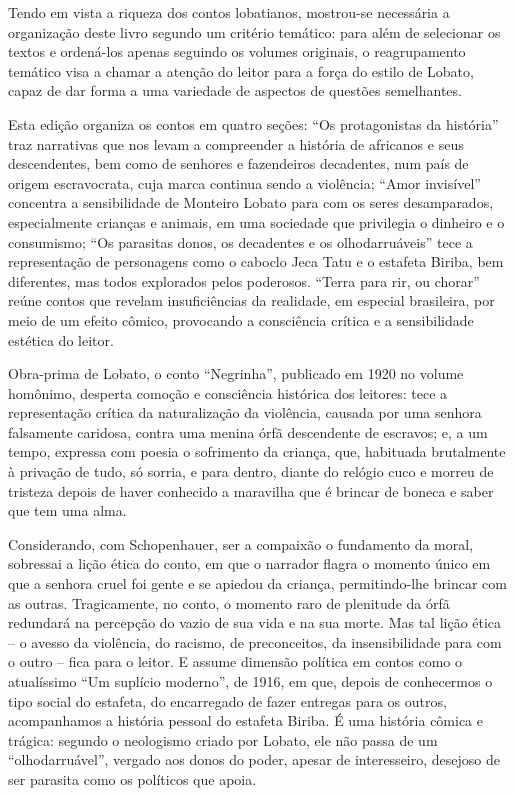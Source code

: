\documentclass[11pt]{extarticle}
\begin{document}
Tendo em vista a riqueza dos contos lobatianos, mostrou-se necessária a
organização deste livro segundo um critério temático: para além de
selecionar os textos e ordená-los apenas seguindo os volumes originais,
o reagrupamento temático visa a chamar a atenção do leitor para a força
do estilo de Lobato, capaz de dar forma a uma variedade de aspectos de
questões semelhantes.

Esta edição organiza os contos em quatro seções: ``Os protagonistas da
história'' traz narrativas que nos levam a compreender a história de
africanos e seus descendentes, bem como de senhores e fazendeiros
decadentes, num país de origem escravocrata, cuja marca continua sendo a
violência; ``Amor invisível'' concentra a sensibilidade de Monteiro
Lobato para com os seres desamparados, especialmente crianças e animais,
em uma sociedade que privilegia o dinheiro e o consumismo; ``Os
parasitas donos, os decadentes e os olhodarruáveis'' tece a
representação de personagens como o caboclo Jeca Tatu e o estafeta
Biriba, bem diferentes, mas todos explorados pelos poderosos. ``Terra
para rir, ou chorar'' reúne contos que revelam insuficiências da
realidade, em especial brasileira, por meio de um efeito cômico,
provocando a consciência crítica e a sensibilidade estética do leitor.

Obra-prima de Lobato, o conto ``Negrinha'', publicado em 1920 no volume
homônimo, desperta comoção e consciência histórica dos leitores: tece a
representação crítica da naturalização da violência, causada por uma
senhora falsamente caridosa, contra uma menina órfã descendente de
escravos; e, a um tempo, expressa com poesia o sofrimento da criança,
que, habituada brutalmente à privação de tudo, só sorria, e para dentro,
diante do relógio cuco e morreu de tristeza depois de haver conhecido a
maravilha que é brincar de boneca e saber que tem uma alma.

Considerando, com Schopenhauer, ser a compaixão o fundamento da moral,
sobressai a lição ética do conto, em que o narrador flagra o momento
único em que a senhora cruel foi gente e se apiedou da criança,
permitindo-lhe brincar com as outras. Tragicamente, no conto, o momento
raro de plenitude da órfã redundará na percepção do vazio de sua vida e
na sua morte. Mas tal lição ética -- o avesso da violência, do racismo,
de preconceitos, da insensibilidade para com o outro -- fica para o
leitor. E assume dimensão política em contos como o atualíssimo ``Um
suplício moderno'', de 1916, em que, depois de conhecermos o tipo social
do estafeta, do encarregado de fazer entregas para os outros,
acompanhamos a história pessoal do estafeta Biriba. É uma história
cômica e trágica: segundo o neologismo criado por Lobato, ele não passa
de um ``olhodarruável'', vergado aos donos do poder, apesar de
interesseiro, desejoso de ser parasita como os políticos que apoia.
\end{document}
